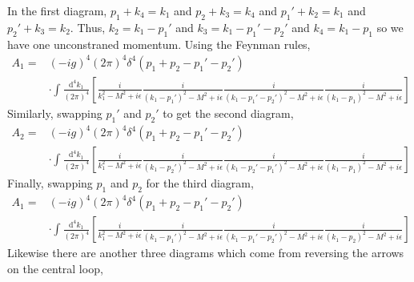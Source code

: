 \documentclass[12pt]{extarticle}
\begin{document}
\begin{enumerate}
\begin{figure}
\begin{minipage}{.33\textwidth}
\begin{center}
\end{center}
\end{minipage}
\end{figure}

In the first diagram, $p_1 + k_4 = k_1$ and $p_2 + k_3 = k_4$ and $p_1' + k_2 = k_1$ and $p_2' + k_3 = k_2$. Thus, $k_2 = k_1 - p_1'$ and $k_3 = k_1  - p_1' - p_2'$ and $k_4 = k_1  - p_1$ so we have one unconstraned momentum. Using the Feynman rules,
\begin{align*}
A_1 = & (-ig)^4 (2 \pi)^4 \delta^4(p_1 + p_2 - p_1' - p_2')
\\
& \cdot \int \frac{\mathrm{d}^4 k_1}{(2 \pi)^4} \left[ \frac{i}{k_1^2 - M^2 + i \epsilon} \frac{i}{(k_1 - p_1')^2 - M^2 + i \epsilon}  \frac{i}{(k_1 - p_1' - p_2')^2 - M^2 + i \epsilon} \frac{i}{(k_1 - p_1)^2 - M^2 + i \epsilon}  \right] 
\end{align*}
Similarly, swapping $p_1'$ and $p_2'$ to get the second diagram,
\begin{align*}
A_2 = & (-ig)^4 (2 \pi)^4 \delta^4(p_1 + p_2 - p_1' - p_2')
\\
& \cdot \int \frac{\mathrm{d}^4 k_1}{(2 \pi)^4} \left[ \frac{i}{k_1^2 - M^2 + i \epsilon} \frac{i}{(k_1 - p_2')^2 - M^2 + i \epsilon}  \frac{i}{(k_1 - p_2' - p_1')^2 - M^2 + i \epsilon} \frac{i}{(k_1 - p_1)^2 - M^2 + i \epsilon}  \right] 
\end{align*}
Finally, swapping $p_1$ and $p_2$ for the third diagram,
\begin{align*}
A_1 = & (-ig)^4 (2 \pi)^4 \delta^4(p_1 + p_2 - p_1' - p_2')
\\
& \cdot \int \frac{\mathrm{d}^4 k_1}{(2 \pi)^4} \left[ \frac{i}{k_1^2 - M^2 + i \epsilon} \frac{i}{(k_1 - p_1')^2 - M^2 + i \epsilon}  \frac{i}{(k_1 - p_1' - p_2')^2 - M^2 + i \epsilon} \frac{i}{(k_1 - p_2)^2 - M^2 + i \epsilon}  \right] 
\end{align*}
Likewise there are another three diagrams which come from reversing the arrows on the central loop,

\end{enumerate}
\end{document}
